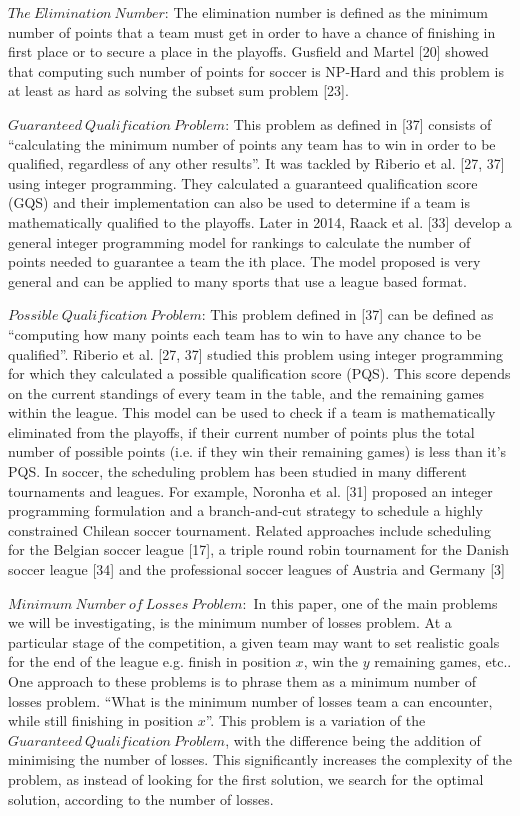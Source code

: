 \documentclass{article}
\begin{document}
	\(The\ Elimination\ Number\): The elimination number is defined as the minimum number of points that a team must get in order to have a chance of finishing in first place or to secure a place in the playoffs. Gusfield and Martel [20] showed that computing such number of points for soccer is NP-Hard and this problem is at least as hard as solving the subset sum problem [23].
	
	\(Guaranteed\ Qualification\ Problem\): This problem as defined in [37] consists of “calculating the minimum number of points any team has to win in order to be qualified, regardless of any other results”. It was tackled by Riberio et al. [27, 37] using integer programming. They calculated a guaranteed qualification score (GQS) and their implementation can also be used to determine if a team is mathematically qualified to the playoffs. Later in 2014, Raack et al. [33] develop a general integer programming model for rankings to calculate the number of points needed to guarantee a team the ith place. The model proposed is very general and can be applied to many sports that use a league based format.
	
	\(Possible\ Qualification\ Problem\): This problem defined in [37] can be defined as “computing how many points each team has to win to have any chance to be qualified”. Riberio et al. [27, 37] studied this problem using integer programming for which they calculated a possible qualification score (PQS). This score depends on the current standings of every team in the table, and the remaining games within the league. This model can be used to check if a team is mathematically eliminated from the playoffs, if their current number of points plus the total number of possible points (i.e. if they win their remaining games) is less than it's PQS. 
	In soccer, the scheduling problem has been studied in many different tournaments and leagues. For example, Noronha et al. [31] proposed an integer programming formulation and a branch-and-cut strategy to schedule a highly constrained Chilean soccer tournament. Related approaches include scheduling for the Belgian soccer league [17], a triple round robin tournament for the Danish soccer league [34] and the professional soccer leagues of Austria and Germany [3]
	
	\(Minimum\ Number\ of\ Losses\ Problem:\) In this paper, one of the main problems we will be investigating, is the minimum number of losses problem. At a particular stage of the competition, a given team may want to set realistic goals for the end of the league e.g. finish in position \(x\), win the \(y\) remaining games, etc.. One approach to these problems is to phrase them as a minimum number of losses problem. ``What is the minimum number of losses team a can encounter, while still finishing in position \(x\)''. This problem is a variation of the \(Guaranteed\ Qualification\ Problem\), with the difference being the addition of minimising the number of losses. This significantly increases the complexity of the problem, as instead of looking for the first solution, we search for the optimal solution, according to the number of losses.
	
\end{document}
